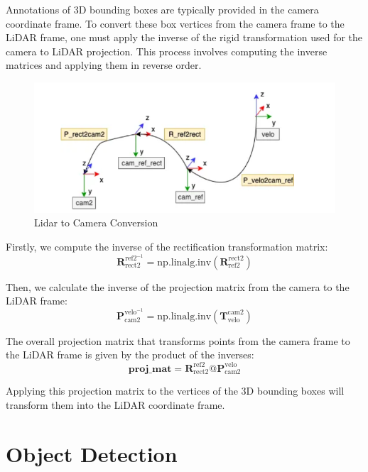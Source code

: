 \documentclass[letterpaper, 10 pt, conference]{ieeeconf}  %
\begin{document}
Annotations of 3D bounding boxes are typically provided in the camera coordinate frame. To convert these box vertices from the camera frame to the LiDAR frame, one must apply the inverse of the rigid transformation used for the camera to LiDAR projection. This process involves computing the inverse matrices and applying them in reverse order.

\begin{figure}[htbp]
  \centering
  \includegraphics[width=\linewidth]{lidarconversiontocamera.png}
  \caption{Lidar to Camera Conversion}
  \label{ Lidar to Camera Conversion}
\end{figure}

Firstly, we compute the inverse of the rectification transformation matrix:
\begin{equation}
\mathbf{R}_{\text{rect2}}^{\text{ref2}^{-1}} = \text{np.linalg.inv}(\mathbf{R}_{\text{ref2}}^{\text{rect2}})
\end{equation}

Then, we calculate the inverse of the projection matrix from the camera to the LiDAR frame:
\begin{equation}
\mathbf{P}_{\text{cam2}}^{\text{velo}^{-1}} = \text{np.linalg.inv}(\mathbf{T}_{\text{velo}}^{\text{cam2}})
\end{equation}

The overall projection matrix that transforms points from the camera frame to the LiDAR frame is given by the product of the inverses:
\begin{equation}
\mathbf{proj\_mat} = \mathbf{R}_{\text{rect2}}^{\text{ref2}} @ \mathbf{P}_{\text{cam2}}^{\text{velo}}
\end{equation}

Applying this projection matrix to the vertices of the 3D bounding boxes will transform them into the LiDAR coordinate frame.

\section{Object Detection}
\end{document}
